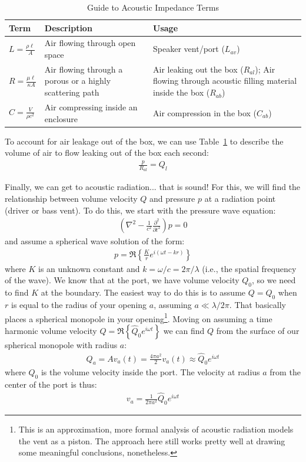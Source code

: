 \documentclass[10pt,letterpaper]{book}
\begin{document}
\begin{table}
\centering
\renewcommand{\arraystretch}{1.5}
\begin{tabularx}{\textwidth}{@{} l X X @{}}
\toprule
Term & Description & Usage \\
\midrule
$L = \frac{\rho \ell}{A}$ & Air flowing through open space & Speaker vent/port ($L_{av}$)  \\ 
$R = \frac{\mu \ell }{\kappa A}$ & Air flowing through a porous or a highly scattering path &
Air leaking out the box ($R_{al}$); \newline 
Air flowing through acoustic filling material inside the box ($R_{ab}$)\\
$C = \frac{V}{\rho c^2}$ & Air compressing inside an enclosure & Air compression in the box ($C_{ab}$)\\
\bottomrule
\end{tabularx}
\caption{Guide to Acoustic Impedance Terms}\label{table:acoustic}
\end{table}

To account for air leakage out of the box, we can use Table~\ref{table:acoustic} to describe the volume of air to flow leaking out of the box each second:
\begin{align}
\frac{p}{R_{al}} = Q_l
\end{align}


Finally, we can get to acoustic radiation... that is sound! For this, we will find the relationship between volume velocity $Q$ and pressure $p$ at a radiation point (driver or bass vent). To do this, we start with the pressure wave equation:
\begin{align}
\left(\nabla^2-\frac{1}{c^2}\frac{\partial^2}{\partial t^2}\right)p=0
\end{align}
and assume a spherical wave solution of the form:
\begin{align}
p=\Re \left\{ \frac{K}{r} e^{i(\omega t - k r)} \right\}
\end{align}
where $K$ is an unknown constant and $k=\omega/c=2\pi/\lambda$ (i.e., the spatial frequency of the wave). We know that at the port, we have volume velocity $Q_0$, so we need to find $K$ at the boundary. The easiest way to do this is to assume $Q=Q_0$ when $r$ is equal to the radius of your opening $a$, assuming $a\ll \lambda/2\pi$. That basically places a spherical monopole in your opening\footnote{This is an approximation, more formal analysis of acoustic radiation models the vent as a piston. The approach here still works pretty well at drawing some meaningful conclusions, nonetheless.}. Moving on assuming a time harmonic volume velocity $Q=\Re\left\{\hat{Q}_0e^{i\omega t}\right\}$ we can find $Q$ from the surface of our spherical monopole with radius $a$:
\begin{align}
Q_a=Av_a(t)=\frac{4\pi a^2}{2} v_a(t) \approx \hat{Q}_0e^{i\omega t}
\end{align}
where $Q_0$ is the volume velocity inside the port. The velocity at radius $a$ from the center of the port is thus:
\begin{align}
v_a=\frac{1}{2\pi a^2} \hat{Q}_0 e^{i\omega t}
\end{align}
\end{document}
